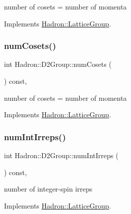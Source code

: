 number of cosets = number of momenta 

Implements \mbox{\hyperlink{structHadron_1_1LatticeGroup_afc76430f36a3a041f86d4058c59bf55e}{Hadron\+::\+Lattice\+Group}}.

\mbox{\label{structHadron_1_1D2Group_a1f8a4f5adef5a9a05edd39f14d21f1cd}} 
\subsubsection{\texorpdfstring{numCosets()}{numCosets()}\hspace{0.1cm}{\footnotesize\ttfamily [2/2]}}
{\footnotesize\ttfamily int Hadron\+::\+D2\+Group\+::num\+Cosets (\begin{DoxyParamCaption}{ }\end{DoxyParamCaption}) const\hspace{0.3cm}{\ttfamily [inline]}, {\ttfamily [virtual]}}

number of cosets = number of momenta 

Implements \mbox{\hyperlink{structHadron_1_1LatticeGroup_afc76430f36a3a041f86d4058c59bf55e}{Hadron\+::\+Lattice\+Group}}.

\mbox{\label{structHadron_1_1D2Group_a15d5aa6a889d3e0f27c3f2796d7157ae}} 
\subsubsection{\texorpdfstring{numIntIrreps()}{numIntIrreps()}\hspace{0.1cm}{\footnotesize\ttfamily [1/2]}}
{\footnotesize\ttfamily int Hadron\+::\+D2\+Group\+::num\+Int\+Irreps (\begin{DoxyParamCaption}{ }\end{DoxyParamCaption}) const\hspace{0.3cm}{\ttfamily [inline]}, {\ttfamily [virtual]}}

number of integer-\/spin irreps 

Implements \mbox{\hyperlink{structHadron_1_1LatticeGroup_af2aa7b39222bf188389356eefcef7547}{Hadron\+::\+Lattice\+Group}}.

\mbox{\label{structHadron_1_1D2Group_a15d5aa6a889d3e0f27c3f2796d7157ae}} 
